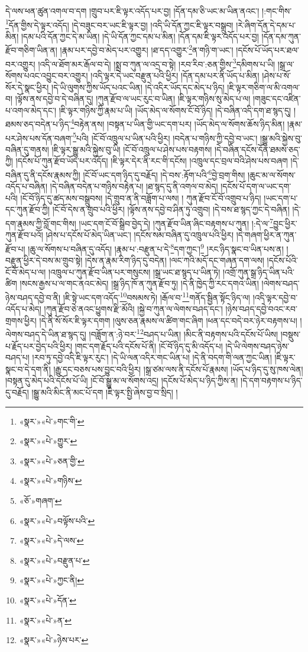 དེ་ལས་ཕན་ཚུན་འགལ་བ་དག །གྲུབ་པར་ཇི་ལྟར་འདོད་པར་བྱ། །དོན་དམ་ཅི་ཡང་མ་ཡིན་ནའང་། །:གང་གིས་\footnote{«སྣར་»«པེ་»གང་གི་}དོན་གྱིས་དེ་ལྟར་འདོད། །དེ་བཟུང་བར་ཡང་ཇི་ལྟར་བྱ། །འདི་ཡི་དོན་ཀྱང་ཇི་ལྟར་བསྒྲུབ། །རེ་ཞིག་དོན་དེ་དམ་པ་མིན། །དམ་པའི་དོན་ཀྱང་དེ་མ་ཡིན། །དེ་ཡི་དོན་ཀྱང་དམ་པ་མིན། །དོན་དམ་ཇི་ལྟར་འདོད་པར་བྱ། །དོན་དམ་ཀུན་རྫོབ་གཅིག་ཡིན་ན། །རྣམ་པར་དབྱེ་བ་མེད་པར་འགྱུར། །ཐ་དད་འགྱུར་\footnote{«སྣར་»«པེ་»གྱུར་}ན་གཉི་ག་ཡང་། །དངོས་པོ་ཡོད་པར་ཐལ་བར་འགྱུར། །འདི་ལ་ཐོག་མར་རྒོལ་བ་དེ། །སྨྲ་བ་ཀུན་ལ་འདྲ་བ་སྟེ། །རབ་རིབ་:ཅན་གྱིས་\footnote{«སྣར་»«པེ་»ཅན་གྱི་}དམིགས་པ་ཡི། །སྒྲ་ལ་སོགས་པའང་འབྱུང་བར་འགྱུར། །འདི་ལྟར་དེ་ཡང་བརྫུན་པའི་ཕྱིར། །དོན་དམ་པར་ནི་ཡོད་པ་མིན། །ཤེས་པ་སོ་སོར་དེ་སྣང་ཕྱིར། །དེ་ཡི་ལུགས་ཀྱིས་ཡོད་པའང་ཡིན། །དེ་འདིར་ཡོད་དང་མེད་པ་ཉིད། །ཇི་ལྟར་གཅིག་ལ་མི་འགལ་བ། །ལྟོས་ནས་དབྱེ་བ་དེ་བཞིན་དུ། །ཀུན་རྫོབ་ལ་ཡང་རུང་བ་ཡིན། །ཇི་ལྟར་གཉིས་སུ་མེད་པ་ལ། །གཟུང་དང་འཛིན་པ་འགལ་མེད་དང་། །ཇི་ལྟར་གཉིས་ཀྱི་རྣམ་པ་ཡི། །ཡོད་མེད་ལ་སོགས་ངོ་བོ་ཉིད། །དེ་བཞིན་འདི་དག་ཐ་སྙད་དུ། །ཐམས་ཅད་བདེན་པ་ཉིད་\footnote{«སྣར་»«པེ་»གཉིས་}བརྟེན་ནས། །བསྟན་པ་ཡིན་གྱི་ཡང་དག་པར། །ཡོད་མེད་ལ་སོགས་ཆོས་ཉིད་མིན། །རྣམ་པར་ཤེས་པས་དོན་བཞག་\footnote{«ཅོ་»གཞག་}པའི། །ངོ་བོ་འཁྲུལ་པ་ཡིན་པའི་ཕྱིར། །བདེན་པ་གཉིས་ཀྱི་དབྱེ་བ་ཡང་། །སྒྱུ་མའི་སྐྱེས་བུ་བཞིན་དུ་གནས། །ཇི་ལྟར་སྒྱུ་མའི་སྐྱེས་བུ་ཡི། །ངོ་བོ་འཁྲུལ་པ་ཤེས་པས་བརྟགས། །དེ་བཞིན་དངོས་དོན་ཐམས་ཅད་ཀྱི། །དངོས་པོ་ཀུན་རྫོབ་ཡོད་པར་འདོད། །ཇི་ལྟར་དེར་ནི་རང་གི་དངོས། །འཁྲུལ་དང་བྲལ་བའི་ཤེས་པས་བཞག །དེ་བཞིན་དུ་ནི་དངོས་རྣམས་ཀྱི། །ངོ་བོ་ཡང་དག་ཉིད་དུ་བརྗོད། །དེ་བས་:རྟོག་པའི་\footnote{«སྣར་»«པེ་»བལྟོས་པའི་}བྱེ་བྲག་གིས། །ཆུང་མ་ལ་སོགས་འདོད་པ་བཞིན། །དེ་བཞིན་བདེན་པ་གཉིས་བརྟེན་པ། །ཐ་སྙད་དུ་ནི་འགལ་བ་མེད། །དངོས་པོ་དག་ལ་ཡང་དག་པའི། །ངོ་བོ་ཉིད་དུ་ཚད་མས་བསྒྲུབས། །དེ་གྲུབ་ན་ནི་བཟློག་པ་ལས། །
ཀུན་རྫོབ་ངོ་བོ་འགྲུབ་པ་ཉིད། །ཡང་དག་པ་དང་ཀུན་རྫོབ་ཀྱི། །ངོ་བོ་དེས་ན་གྲུབ་པའི་ཕྱིར། །ལྟོས་ནས་དབྱེ་བ་ཤིན་ཏུ་འགྲུབ། །དེ་བས་ཐ་སྙད་ཀྱང་དེ་བཞིན། །དེ་དག་རྣམས་ཀྱི་བློ་གང་གིས། །ཡང་དག་ངོ་བོ་སྒྲིབ་བྱེད་དེ། །ཀུན་རྫོབ་ཡིན་ཞིང་བརྟགས་པ་ཀུན། །:དེ་ལ་\footnote{«སྣར་»«པེ་»དེ་ལས་}བྱུང་ཕྱིར་ཀུན་རྫོབ་པའོ། །ཤེས་པ་དངོས་པོ་མེད་ཡིན་ཡང་། །དངོས་སམ་བཞིན་དུ་འཁྲུལ་པའི་ཕྱིར། །དེ་གཞག་ཕྱིར་ན་ཀུན་རྫོབ་པ། །ཆུ་ལ་སོགས་པ་བཞིན་དུ་འདོད། །རྣམ་པ་:བརྫུན་པ་དེ་\footnote{«སྣར་»«པེ་»བརྫུན་པ་}དག་ཀྱང་།\footnote{«སྣར་»«པེ་»ཀྱང་ནི།} །རང་ཉིད་སྣང་བ་ཡིན་པས་ན། །བརྫུན་ཕྱིར་དེ་བས་མ་གྲུབ་སྟེ། །དེས་ན་རྣམ་རིག་ཉིད་དུ་བདེན། །ལང་ཀའི་མདོ་དང་གཞན་དག་ལས། །དངོས་པོའི་ངོ་བོ་མེད་པ་ལ། །འཁྲུལ་པ་ཀུན་རྫོབ་ཡིན་པར་གསུངས། །སྒྲ་ཡང་ཐ་སྙད་པ་ཡིན་ཏེ། །འགྲོ་ཀུན་སྒྲ་ཉིད་ཡིན་པའི་ཚིག །སངས་རྒྱས་པ་ལ་གང་ནའང་མེད། །སྒྲ་ཉིད་ཁོ་ན་ཀུན་རྫོབ་ཏུ། །དེ་ནི་ཁྱེད་ཀྱི་རང་དགའ་ཡིན། །ལེགས་བཤད་ཉེས་བཤད་དབྱེ་བ་ནི། །ཇི་སྟེ་ཡང་དག་འདོད་\footnote{«སྣར་»«པེ་»དོན་}བསམས་ཏེ། །རྒོལ་བ་\footnote{«སྣར་»«པེ་»ན་}གནོད་སྦྱིན་སྟོང་ཉིད་ལ། །འདི་ལྟར་དབྱེ་བ་འདོད་པ་མེད། །ཀུན་རྫོབ་ཅེ་ནའང་ཕྱུགས་རྫི་མོའི། །སྐྱེ་བ་ཀུན་ལ་ལེགས་བཤད་དང་། །ཉེས་བཤད་དབྱེ་བའང་རབ་གྲགས་ཕྱིར། །དེ་ནི་སོ་སོར་ཇི་ལྟར་དགག །ལུས་ཅན་རྣམས་ལ་ཚིག་གང་ཞིག །ཕན་དང་བདེ་བར་ཉེར་བརྟགས་པ། །ལེགས་བཤད་དེ་ཡིན་ཐ་སྙད་དུ། །བཟློག་ན་:ཉེ་བར་\footnote{«སྣར་»«པེ་»ཉེས་པར་}བཤད་པ་ཡིན། །མིང་ནི་བརྟགས་པའི་དངོས་པོ་ཡིས། །བསྡུས་པ་རྗོད་པར་བྱེད་པའི་ཕྱིར། །གང་དག་རྗོད་པའི་དངོས་པོ་ནི། །ངོ་བོ་ཉིད་དུ་མི་འདོད་པ། །དེ་ཡི་ལེགས་བཤད་ཉེས་བཤད་པ། །རབ་ཏུ་དབྱེ་འདི་ཇི་ལྟར་རུང་། །དེ་ཡི་ལན་འདིར་གང་ཡིན་པ། །དེ་ནི་བདག་གི་ལན་ཀྱང་ཡིན། །ཇི་ལྟར་སྣང་བ་དེ་དག་ནི། །རྒྱུ་དང་བཅས་པས་བྱུང་བའི་ཕྱིར། །སྒྲ་ཙམ་ལས་ནི་དངོས་པོ་རྣམས། །ཡོད་པ་ཉིད་དུ་སུ་ཁས་ལེན། །བསྟན་དུ་མེད་པའི་དངོས་པོ་ཡི། །ངོ་བོ་སྒྱུ་མ་ལ་སོགས་འདྲ། །དངོས་པོ་མེད་པ་ཉིད་ཀྱིས་ན། །དེ་དག་བརྟགས་པ་ཉིད་དུ་བརྗོད། །སྒྱུ་མའི་མིང་ནི་མང་པོ་དག །ཇི་ལྟར་སྤྱི་ཞེས་བྱ་བ་སྲིད། །
